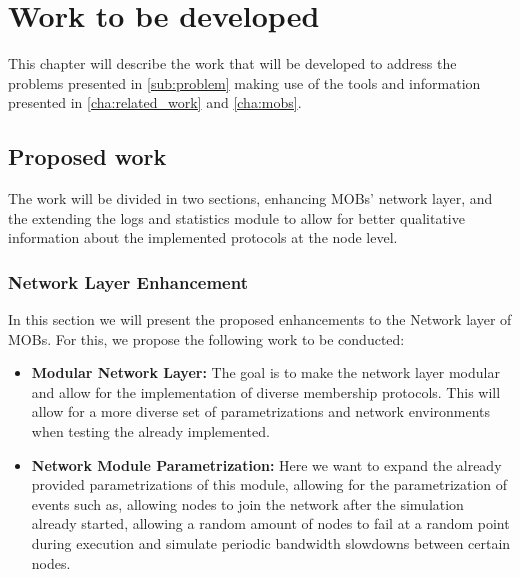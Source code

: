 
%

\chapter{Work to be developed}
\label{cha:work_to_be_developed}

This chapter will describe the work that will be developed to address the
problems presented in \ref{sub:problem} making use of the tools and information
presented in \ref{cha:related_work} and \ref{cha:mobs}.

\section{Proposed work}
\label{sub:sub_proposed_work}

The work will be divided in two sections, enhancing MOBs' network layer,
and the extending the logs and statistics module to allow for better qualitative
information about the implemented protocols at the node level.

\subsection{Network Layer Enhancement}
\label{subsec:network_layer_enchancement}

In this section we will present the proposed enhancements to the Network layer of
MOBs. For this, we propose the following work to be conducted:

\begin{itemize}
  \item \textbf{Modular Network Layer:} The goal is to make the network layer
modular and allow for the implementation of diverse membership protocols. This
will allow for a more diverse set of parametrizations and network environments
when testing the already implemented.
  \item \textbf{Network Module Parametrization:} Here we want to expand the already
provided parametrizations of this module, allowing for the parametrization of events
such as, allowing nodes to join the network after the simulation already started,
allowing a random amount of nodes to fail at a random point during execution and
simulate periodic bandwidth slowdowns between certain nodes.
\end{itemize}

